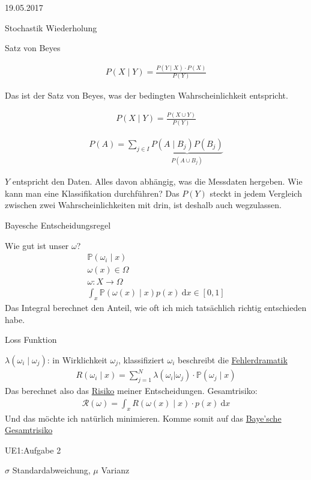 \begin{VL}19.05.2017
\end{VL}

\begin{topic} Stochastik Wiederholung
\end{topic}

\begin{definition}Satz von Beyes
\end{definition}
\begin{align*}P(X\mid Y) = \frac{P(Y\mid X) \cdot P(X)}{P(Y)}
\end{align*}

Das ist der Satz von Beyes, was der bedingten Wahrscheinlichkeit entspricht. 

\begin{align*}P(X\mid Y) = \frac{P(X\cup Y)}{P(Y)}
\end{align*}

\begin{align*}P(A) = \sum_{j\in I} \underbrace{P(A\mid B_j)P(B_j)}_{P(A\cup B_j)}
\end{align*}

$Y$ entspricht den Daten. Alles davon abhängig, was die Messdaten hergeben. Wie kann man eine Klassifikation durchführen? Das $P(Y)$ steckt in jedem Vergleich zwischen zwei Wahrscheinlichkeiten mit drin, ist deshalb auch wegzulassen. 

\begin{definition}
	Bayesche Entscheidungsregel
\end{definition}
Wie gut ist unser $\omega$?
\begin{align*}
	\mathbb{P}(\omega_i\mid x)\\
	\omega(x) \in \Omega\\
	\omega: X \to \Omega\\
	\int_x \mathbb{P}(\omega(x)\mid x)p(x)~\text{d}x \in [0,1]
\end{align*}
Das Integral berechnet den Anteil, wie oft ich mich tatsächlich richtig entschieden habe. 

\begin{topic}Loss Funktion
\end{topic}
$\lambda(\omega_i\mid \omega_j)$: in Wirklichkeit $\omega_j$, klassifiziert $\omega_i$ beschreibt die \underline{Fehlerdramatik}
\begin{align*}R(\omega_i\mid x) = \sum_{j = 1}^{N} \lambda(\omega_i|\omega_j)\cdot \mathbb{P}(\omega_j\mid x)
\end{align*}
Das berechnet also das \underline{Risiko} meiner Entscheidungen. Gesamtrisiko:
\begin{align*}
\mathcal{R}(\omega) = \int_x R(\omega(x)\mid x)\cdot p(x)~\text{d}x
\end{align*}
Und das möchte ich natürlich minimieren. Komme somit auf das \underline{Baye'sche Gesamtrisiko}

\begin{topic}UE1:Aufgabe 2
\end{topic}

$\sigma$ Standardabweichung, $\mu$ Varianz